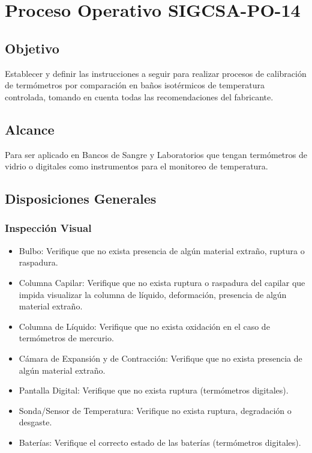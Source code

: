 \section{Proceso Operativo SIGCSA-PO-14}
	\subsection{Objetivo}
		\par 
			Establecer y definir las instrucciones a seguir para realizar procesos de calibración de termómetros
			por comparación en baños isotérmicos de temperatura controlada, tomando en cuenta todas las
			recomendaciones del fabricante.
	\subsection{Alcance}
		\par 
			Para ser aplicado en Bancos de Sangre y Laboratorios que tengan termómetros de vidrio o digitales
			como instrumentos para el monitoreo de temperatura.
	\subsection{Disposiciones Generales}
		\subsubsection{Inspección Visual}
			\begin{itemize}
				\item Bulbo: Verifique que no exista presencia de algún material extraño, ruptura o
				raspadura.
				
				\item Columna Capilar: Verifique que no exista ruptura o raspadura del capilar que
				impida visualizar la columna de líquido, deformación, presencia de algún material
				extraño.
				
				\item Columna de Líquido: Verifique que no exista oxidación en el caso de termómetros
				de mercurio.
				
				\item Cámara de Expansión y de Contracción: Verifique que no exista presencia de algún
				material extraño.
				
				\item Pantalla Digital: Verifique que no exista ruptura (termómetros digitales).
				
				\item Sonda/Sensor de Temperatura: Verifique no exista ruptura, degradación o
				desgaste.
				
				\item Baterías: Verifique el correcto estado de las baterías (termómetros digitales).
			\end{itemize}
		
